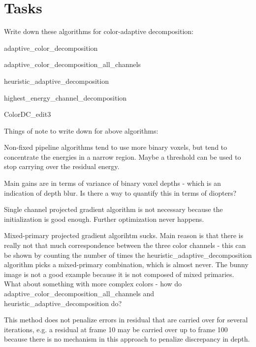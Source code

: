 \section{Tasks}
\begin{compact_todolist}
\item Write down these algorithms for color-adaptive decomposition:
    \begin{compact_todolist}
    \item adaptive\_color\_decomposition
    \item adaptive\_color\_decomposition\_all\_channels
    \item heuristic\_adaptive\_decomposition
    \item highest\_energy\_channel\_decomposition
    \item ColorDC\_edit3
    \end{compact_todolist}
\item Things of note to write down for above algorithms:
    \begin{compact_todolist}
    \item Non-fixed pipeline algorithms tend to use more binary voxels, but tend to concentrate the energies in a narrow region. Maybe a threshold can be used to stop carrying over the residual energy. 
    \item Main gains are in terms of variance of binary voxel depths - which is an indication of depth blur. Is there a way to quantify this in terms of diopters?
    \item Single channel projected gradient algorithm is not necessary because the initialization is good enough. Further optimization never happens.
    \item Mixed-primary projected gradient algorihtm sucks. Main reason is that there is really not that much correspondence between the three color channels - this can be shown by counting the number of times the heuristic\_adaptive\_decomposition algorithm picks a mixed-primary combination, which is almost never. The bunny image is not a good example because it is not composed of mixed primaries. What about something with more complex colors - how do adaptive\_color\_decomposition\_all\_channels and heuristic\_adaptive\_decomposition do?
    \item This method does not penalize errors in residual that are carried over for several iterations, e.g. a residual at frame 10 may be carried over up to frame 100 because there is no mechanism in this approach to penalize discrepancy in depth.

\end{compact_todolist}
\end{compact_todolist}
